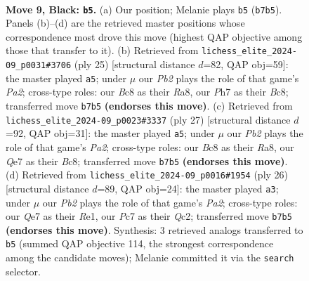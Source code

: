 \documentclass[11pt]{article}
\begin{document}
\begin{figure}[p]
\label{fig:thought-m15}
\end{figure}

\clearpage

\begin{figure}[p]\centering
\begin{subfigure}{0.46\textwidth}\centering
\resizebox{\linewidth}{!}{%
\newchessgame
\chessboard[
  setfen={1rb2rk1/ppppqppp/2n1pn2/2P5/3P4/2B1PNP1/PP3P1P/R2QKB1R b KQ - 0 9},
  showmover=false,
  pgfstyle=straightmove, color=movearrow, markmove={b7-b5}
]}
\caption{}
\end{subfigure}\hfill
\begin{subfigure}{0.46\textwidth}\centering
\resizebox{\linewidth}{!}{%
\newchessgame
\chessboard[
  setfen={r1b2rk1/pppnqppp/3p4/3Pp3/1PP1n3/P4NP1/4PPBP/R2QBRK1 b - - 0 13},
  showmover=false,
  pgfstyle=straightmove, color=movearrow, markmove={a7-a5}
]}
\caption{}
\end{subfigure}
\\[4pt]
\begin{subfigure}{0.46\textwidth}\centering
\resizebox{\linewidth}{!}{%
\newchessgame
\chessboard[
  setfen={r1bq1rk1/pp3pb1/2p2npn/3p3p/B2Pp3/4P2P/PPP1NPP1/RNBQK2R b KQ - 1 14},
  showmover=false,
  pgfstyle=straightmove, color=movearrow, markmove={a7-a5}
]}
\caption{}
\end{subfigure}\hfill
\begin{subfigure}{0.46\textwidth}\centering
\resizebox{\linewidth}{!}{%
\newchessgame
\chessboard[
  setfen={r1bq1r2/p2nppkp/3p2p1/2pP3n/1pP5/1P1B1N2/P1QN1PPP/R3R1K1 w - - 0 14},
  showmover=false,
  pgfstyle=straightmove, color=movearrow, markmove={a2-a3}
]}
\caption{}
\end{subfigure}
\caption{\textbf{Move 9, Black: \texttt{b5}.} (a) Our position; Melanie plays \texttt{b5} (\texttt{b7b5}). Panels (b)--(d) are the retrieved master positions whose correspondence most drove this move (highest QAP objective among those that transfer to it). (b) Retrieved from \texttt{lichess\_elite\_2024-09\_p0031\#3706} (ply 25) [structural distance $d$=82, QAP obj=59]: the master played \texttt{a5}; under $\mu$ our \emph{Pb2} plays the role of that game's \emph{Pa2}; cross-type roles: our \emph{B}c8 as their \emph{R}a8, our \emph{P}h7 as their \emph{B}c8; transferred move \texttt{b7b5} \textbf{(endorses this move)}. (c) Retrieved from \texttt{lichess\_elite\_2024-09\_p0023\#3337} (ply 27) [structural distance $d$=92, QAP obj=31]: the master played \texttt{a5}; under $\mu$ our \emph{Pb2} plays the role of that game's \emph{Pa2}; cross-type roles: our \emph{B}c8 as their \emph{R}a8, our \emph{Q}e7 as their \emph{B}c8; transferred move \texttt{b7b5} \textbf{(endorses this move)}. (d) Retrieved from \texttt{lichess\_elite\_2024-09\_p0016\#1954} (ply 26) [structural distance $d$=89, QAP obj=24]: the master played \texttt{a3}; under $\mu$ our \emph{Pb2} plays the role of that game's \emph{Pa2}; cross-type roles: our \emph{Q}e7 as their \emph{R}e1, our \emph{P}c7 as their \emph{Q}c2; transferred move \texttt{b7b5} \textbf{(endorses this move)}. Synthesis: 3 retrieved analogs transferred to \texttt{b5} (summed QAP objective 114, the strongest correspondence among the candidate moves); Melanie committed it via the \texttt{search} selector.}

\end{figure}
\end{document}
